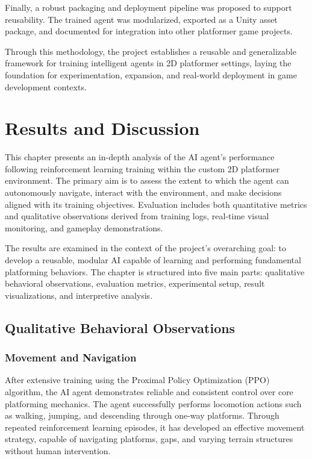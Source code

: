 \documentclass[12pt,oneside,openright,a4paper]{cpe-english-project}
\begin{document}
Finally, a robust packaging and deployment pipeline was proposed to support reusability. The trained agent was modularized, exported as a Unity asset package, and documented for integration into other platformer game projects.  

Through this methodology, the project establishes a reusable and generalizable framework for training intelligent agents in 2D platformer settings, laying the foundation for experimentation, expansion, and real-world deployment in game development contexts.



\chapter{Results and Discussion}
This chapter presents an in-depth analysis of the AI agent’s performance following reinforcement learning training within the custom 2D platformer environment. The primary aim is to assess the extent to which the agent can autonomously navigate, interact with the environment, and make decisions aligned with its training objectives. Evaluation includes both quantitative metrics and qualitative observations derived from training logs, real-time visual monitoring, and gameplay demonstrations.

The results are examined in the context of the project’s overarching goal: to develop a reusable, modular AI capable of learning and performing fundamental platforming behaviors. The chapter is structured into five main parts: qualitative behavioral observations, evaluation metrics, experimental setup, result visualizations, and interpretive analysis.

\section{Qualitative Behavioral Observations}
\subsection{Movement and Navigation}

After extensive training using the Proximal Policy Optimization (PPO) algorithm, the AI agent demonstrates reliable and consistent control over core platforming mechanics. The agent successfully performs locomotion actions such as walking, jumping, and descending through one-way platforms. Through repeated reinforcement learning episodes, it has developed an effective movement strategy, capable of navigating platforms, gaps, and varying terrain structures without human intervention.
\end{document}
